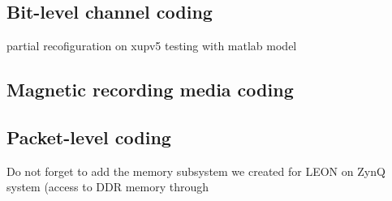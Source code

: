 \subsection{Bit-level channel coding}
partial recofiguration on xupv5
testing with matlab model
\subsection{Magnetic recording media coding}
\subsection{Packet-level coding}
Do not forget to add the memory subsystem we created for LEON on ZynQ system (access to DDR memory through

